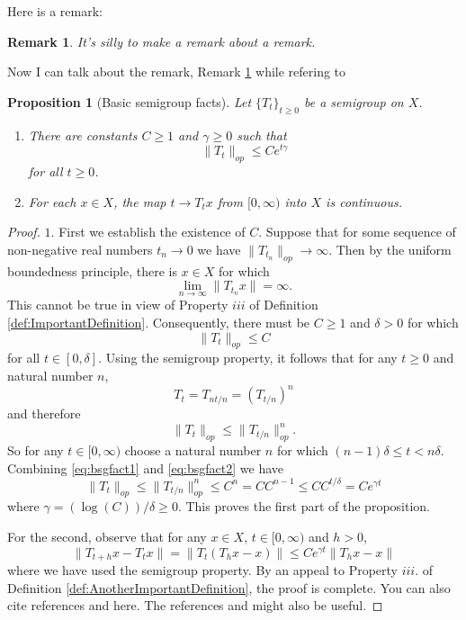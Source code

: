 \documentclass{article}
\newtheorem{proposition}{Proposition}
\newtheorem{remark}{Remark}
\begin{document}
Here is a remark:
\begin{remark}\label{rmk:Aremark}
It's silly to make a remark about a remark.
\end{remark}
Now I can talk about the remark, Remark \ref{rmk:Aremark} while refering to 
\begin{proposition}[Basic semigroup facts]\label{prop:basicsemigroupfacts}
Let $\{T_t\}_{t\geq 0}$ be a semigroup on $X$. 
\begin{enumerate}
 \item There are constants $C\geq 1$ and $\gamma\geq 0$ such that
\begin{equation*}
\|T_t\|_{op}\leq Ce^{t\gamma}
\end{equation*}
for all $t\geq 0$. 
\item For each $x\in X$, the map $t\rightarrow T_tx$ from $[0,\infty)$ into $X$ is continuous.
\end{enumerate}
\end{proposition}
\begin{proof}
$1.$ First we establish the existence of $C$. Suppose that for some sequence of non-negative real numbers $t_n\rightarrow 0$ we have $\|T_{t_n}\|_{op}\rightarrow \infty$. Then by the uniform boundedness principle, there is $x\in X$ for which
\begin{equation*}
\lim_{n\rightarrow\infty}\|T_{t_n}x\|=\infty.
\end{equation*}
This cannot be true in view of Property $iii$ of Definition \ref{def:ImportantDefinition}. Consequently, there must be $C\geq 1$ and $\delta>0$ for which
\begin{equation}\label{eq:bsgfact1}
\|T_t\|_{op}\leq C
\end{equation}
for all $t\in[0,\delta]$. Using the semigroup property, it follows that for any $t\geq 0$ and natural number $n$,
\begin{equation*}
T_{t}=T_{nt/n}=(T_{t/n})^n
\end{equation*}
and therefore
\begin{equation}\label{eq:bsgfact2}
 \|T_{t}\|_{op}\leq \|T_{t/n}\|_{op}^n.
\end{equation}
So for any $t\in[0,\infty)$ choose a natural number $n$ for which $(n-1)\delta\leq t< n\delta$. Combining \eqref{eq:bsgfact1} and \eqref{eq:bsgfact2} we have
\begin{equation*}
\|T_t\|_{op}\leq \|T_{t/n}\|_{op}^n\leq C^n=CC^{n-1}\leq CC^{t/\delta}=Ce^{\gamma t}
\end{equation*}
 where $\gamma=(\log(C))/\delta\geq 0$. This proves the first part of the proposition.

For the second, observe that for any $x\in X$, $t\in[0,\infty)$ and $h>0$,
\begin{equation*}
\|T_{t+h}x-T_tx\|=\|T_t(T_hx-x)\|\leq Ce^{\gamma t}\|T_hx-x\|
\end{equation*}
where we have used the semigroup property. By an appeal to Property $iii.$ of Definition \ref{def:AnotherImportantDefinition}, the proof is complete. You can also cite references \cite{HB98} and \cite{CA} here. The references  \cite{MSW00} and  \cite{Rei91}might also be useful.
\end{proof}
\end{document}

